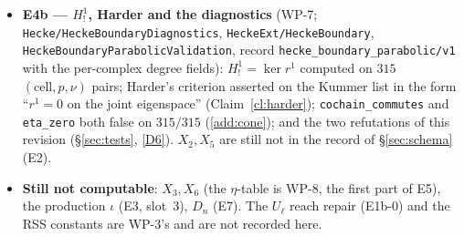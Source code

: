 \documentclass[11pt]{article}
\theoremstyle{remark}
\newcommand{\Dn}{D_n}
\begin{document}
\begin{itemize}
  default configuration; \texttt{HeckeExtAlgebraValidation} on constructed truths ($0.10$\,s).
  The real-block arms are E1b's.
\item \textbf{E4b --- $H^1_!$, Harder and the diagnostics} (WP-7;
  \texttt{Hecke/HeckeBoundaryDiagnostics}, \texttt{HeckeExt/HeckeBoundary},
  \texttt{HeckeBoundaryParabolicValidation}, record \texttt{hecke\_boundary\_parabolic/v1} with
  the per-complex degree fields): $H^1_!=\ker r^1$ computed on $315$ $(\text{cell},p,\nu)$
  pairs; Harder's criterion asserted on the Kummer list in the form ``$r^1=0$ on the joint
  eigenspace'' (Claim~\ref{cl:harder}); \texttt{cochain\_commutes} and \texttt{eta\_zero} both
  false on $315/315$ (\ref{add:cone}); and the two refutations of this revision
  (\S\ref{sec:tests}, \ref{D6}). $X_2,X_5$ are still not in the record of \S\ref{sec:schema}
  (E2).
\item \textbf{Still not computable}: $X_3,X_6$ (the $\eta$-table is WP-8, the first part of
  E5), the production $\iota$ (E3, slot~3), $\Dn$ (E7). The $U_\ell$ reach repair (E1b-0) and the
  RSS constants are WP-3's and are not recorded here.
\end{itemize}
\end{document}
